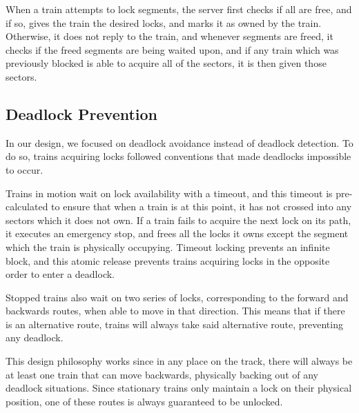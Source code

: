 \documentclass[12pt, titlepage]{article}
\begin{document}
    When a train attempts to lock segments, the server first checks if all are free, and if so, gives the train the desired locks, and marks it as owned by the train. Otherwise, it does not reply to the train, and whenever segments are freed, it checks if the freed segments are being waited upon, and if any train which was previously blocked is able to acquire all of the sectors, it is then given those sectors.

    \subsection{Deadlock Prevention}
    \label{sec:deadlock}
    
    In our design, we focused on deadlock avoidance instead of deadlock detection. To do so, trains acquiring locks followed conventions that made deadlocks impossible to occur.
    
    Trains in motion wait on lock availability with a timeout, and this timeout is pre-calculated to ensure that when a train is at this point, it has not crossed into any sectors which it does not own. If a train fails to acquire the next lock on its path, it executes an emergency stop, and frees all the locks it owns except the segment which the train is physically occupying. Timeout locking prevents an infinite block, and this atomic release prevents trains acquiring locks in the opposite order to enter a deadlock.
    
    Stopped trains also wait on two series of locks, corresponding to the forward and backwards routes, when able to move in that direction. This means that if there is an alternative route, trains will always take said alternative route, preventing any deadlock.
    
    This design philosophy works since in any place on the track, there will always be at least one train that can move backwards, physically backing out of any deadlock situations. Since stationary trains only maintain a lock on their physical position, one of these routes is always guaranteed to be unlocked.
    
\end{document}
